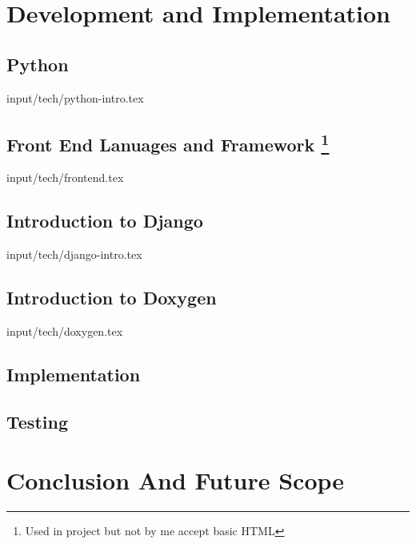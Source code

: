 \documentclass[12pt]{report}
\begin{document}




\newpage
\chapter{Development and Implementation}
\section{Python} 
 {input/tech/python-intro.tex}


\section[Front End Lanuages and Framework]{Front End Lanuages and Framework \footnote{ Used in project but not by me accept basic HTML}}
 {input/tech/frontend.tex}




\section{Introduction to Django}
 {input/tech/django-intro.tex}

\section{Introduction to Doxygen}
 {input/tech/doxygen.tex}






\section{Implementation}


\section{Testing}


\chapter{Conclusion And Future Scope}



\end{document}
